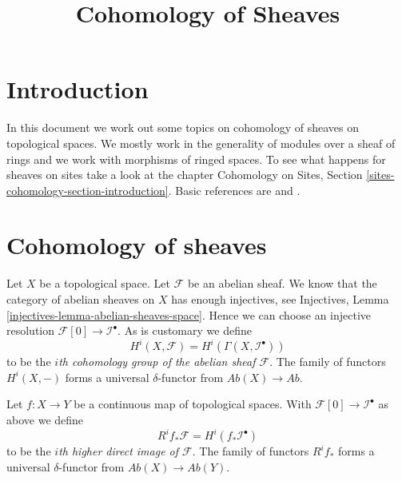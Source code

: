 

%


\title{Cohomology of Sheaves}


\maketitle

\label{section-phantom}

\tableofcontents

\section{Introduction}
\label{section-introduction}

\noindent
In this document we work out some topics on cohomology of sheaves
on topological spaces. We mostly work in the generality of modules
over a sheaf of rings and we work with morphisms of ringed spaces.
To see what happens for sheaves on sites take a look at the chapter
Cohomology on Sites, Section \ref{sites-cohomology-section-introduction}.
Basic references are \cite{Godement} and \cite{Iversen}.





\section{Cohomology of sheaves}
\label{section-cohomology-sheaves}

\noindent
Let $X$ be a topological space. Let $\mathcal{F}$ be an abelian sheaf.
We know that the category of abelian sheaves on $X$ has enough injectives, see
Injectives, Lemma \ref{injectives-lemma-abelian-sheaves-space}.
Hence we can choose an injective resolution
$\mathcal{F}[0] \to \mathcal{I}^\bullet$. As is customary we define
\begin{equation}
\label{equation-cohomology}
H^i(X, \mathcal{F}) = H^i(\Gamma(X, \mathcal{I}^\bullet))
\end{equation}
to be the {\it $i$th cohomology group of the abelian sheaf $\mathcal{F}$}.
The family of functors $H^i(X, -)$ forms a universal $\delta$-functor
from $\textit{Ab}(X) \to \textit{Ab}$.

\medskip\noindent
Let $f : X \to Y$ be a continuous map of topological spaces. With
$\mathcal{F}[0] \to \mathcal{I}^\bullet$ as above
we define
\begin{equation}
\label{equation-higher-direct-image}
R^if_*\mathcal{F} = H^i(f_*\mathcal{I}^\bullet)
\end{equation}
to be the {\it $i$th higher direct image of $\mathcal{F}$}.
The family of functors $R^if_*$ forms a universal $\delta$-functor
from $\textit{Ab}(X) \to \textit{Ab}(Y)$.

